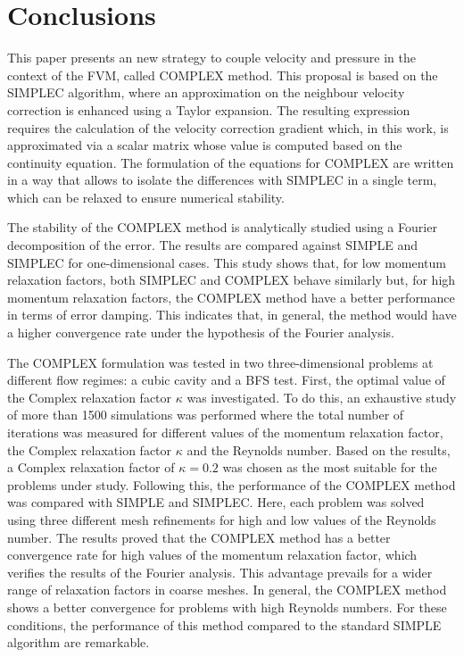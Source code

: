 \documentclass[final,3p,times,11pt,onecolumn]{myElsarticle}
\numberwithin{equation}{section}
\begin{document}
\section{Conclusions}
\label{sec:conclusions}
This paper presents an new strategy to couple velocity and pressure in the context of the FVM, called COMPLEX method. This proposal is based on the SIMPLEC algorithm, where an approximation on the neighbour velocity correction is enhanced using a Taylor expansion. The resulting expression requires the calculation of the velocity correction gradient which, in this work, is approximated via a scalar matrix whose value is computed based on the continuity equation. The formulation of the equations for COMPLEX are written in a way that allows to isolate the differences with SIMPLEC in a single term, which can be relaxed to ensure numerical stability.

The stability of the COMPLEX method is analytically studied using a Fourier decomposition of the error. The results are compared against SIMPLE and SIMPLEC for one-dimensional cases. This study shows that, for low momentum relaxation factors, both SIMPLEC and COMPLEX behave similarly but, for high momentum relaxation factors, the COMPLEX method have a better performance in terms of error damping. This indicates that, in general, the method would have a higher convergence rate under the hypothesis of the Fourier analysis.

The COMPLEX formulation was tested in two three-dimensional problems at different flow regimes: a cubic cavity and a BFS test. First, the optimal value of the Complex relaxation factor $\kappa$ was investigated. To do this, an exhaustive study of more than 1500 simulations was performed where the total number of iterations was measured for different values of the momentum relaxation factor, the Complex relaxation factor $\kappa$ and the Reynolds number. Based on the results, a Complex relaxation factor of $\kappa = 0.2$ was chosen as the most suitable for the problems under study. Following this, the performance of the COMPLEX method was compared with SIMPLE and SIMPLEC. Here, each problem was solved using three different mesh refinements for high and low values of the Reynolds number. The results proved that the COMPLEX method has a better convergence rate for high values of the momentum relaxation factor, which verifies the results of the Fourier analysis. This advantage prevails for a wider range of relaxation factors in coarse meshes. In general, the COMPLEX method shows a better convergence for problems with high Reynolds numbers. For these conditions, the performance of this method compared to the standard SIMPLE algorithm are remarkable.
\end{document}
